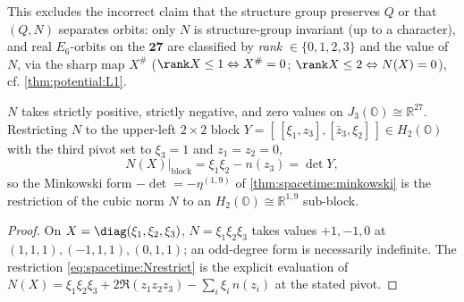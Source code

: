 This excludes the incorrect claim that the structure group preserves $Q$ or that
$(Q,N)$ separates orbits: only $N$ is structure-group invariant (up to a character),
and real $E_6$-orbits on the $\mathbf{27}$ are classified by \emph{rank}
$\in\{0,1,2,3\}$ and the value of $N$, via the sharp map $X^\#$
($\rank X\le1\Leftrightarrow X^\#=0$; $\rank X\le2\Leftrightarrow N(X)=0$), cf.
\autoref{thm:potential:L1}.

\begin{theorem}
\label{thm:spacetime:Nindef}
$N$ takes strictly positive, strictly negative, and zero values on
$J_3(\mathbb O)\cong\mathbb R^{27}$. Restricting $N$ to the upper-left $2\times2$ block
$Y=[\,[\xi_1,z_3],[\bar z_3,\xi_2]\,]\in H_2(\mathbb O)$ with the third pivot set to
$\xi_3=1$ and $z_1=z_2=0$,
\begin{equation}\label{eq:spacetime:Nrestrict}
  N(X)\big|_{\mathrm{block}}=\xi_1\xi_2-n(z_3)=\det Y,
\end{equation}
so the Minkowski form $-\det=-\eta^{(1,9)}$ of \autoref{thm:spacetime:minkowski} is the
restriction of the cubic norm $N$ to an $H_2(\mathbb O)\cong\mathbb R^{1,9}$ sub-block.
\end{theorem}
\begin{proof}
On $X=\diag(\xi_1,\xi_2,\xi_3)$, $N=\xi_1\xi_2\xi_3$ takes values $+1,-1,0$ at
$(1,1,1),(-1,1,1),(0,1,1)$; an odd-degree form is necessarily indefinite. The
restriction \eqref{eq:spacetime:Nrestrict} is the explicit evaluation of
$N(X)=\xi_1\xi_2\xi_3+2\Re(z_1z_2z_3)-\sum_i\xi_i\,n(z_i)$ at the stated pivot.
\end{proof}


